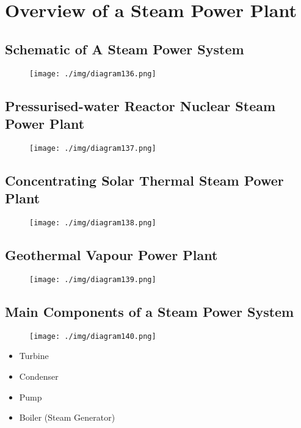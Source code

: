 \section{Overview of a Steam Power Plant}
\subsection{Schematic of A Steam Power System}
\begin{figure}[H]
  \centering
  \texttt{[image: ./img/diagram136.png]}
  \caption{}
\end{figure}
\subsection{Pressurised-water Reactor Nuclear Steam Power Plant}
\begin{figure}[H]
  \centering
  \texttt{[image: ./img/diagram137.png]}
  \caption{}
\end{figure}
\subsection{Concentrating Solar Thermal Steam Power Plant}
\begin{figure}[H]
  \centering
  \texttt{[image: ./img/diagram138.png]}
  \caption{}
\end{figure}
\subsection{Geothermal Vapour Power Plant}
\begin{figure}[H]
  \centering
  \texttt{[image: ./img/diagram139.png]}
  \caption{}
\end{figure}
\subsection{Main Components of a Steam Power System}
\begin{figure}[H]
  \centering
  \texttt{[image: ./img/diagram140.png]}
  \caption{}
\end{figure}
\begin{itemize}[noitemsep]
  \item Turbine
  \item Condenser
  \item Pump
  \item Boiler (Steam Generator)
\end{itemize}
